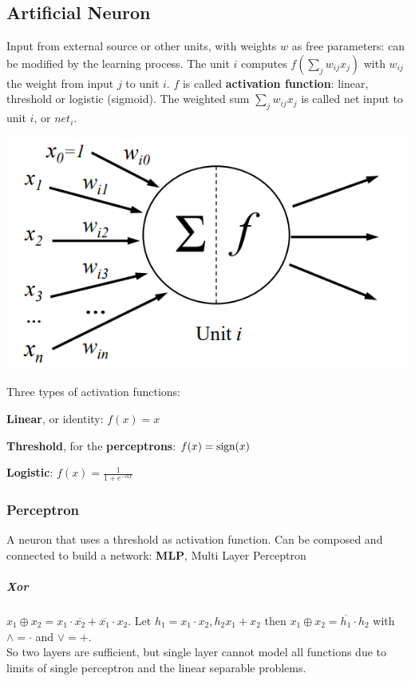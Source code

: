 \documentclass[10pt]{report}
\begin{document}
\subsection{Artificial Neuron} Input from external source or other units, with weights $w$ as free parameters: can be modified by the learning process. The unit $i$ computes $f(\sum_j w_{ij}x_j)$ with $w_{ij}$ the weight from input $j$ to unit $i$. $f$ is called \textbf{activation function}: linear, threshold or logistic (sigmoid). The weighted sum $\sum_j w_{ij}x_j$ is called net input to unit $i$, or $net_i$.
\begin{center}
	\includegraphics[scale=0.75]{6.png}
\end{center}
Three types of activation functions:
\begin{list}{}{}
	\item \textbf{Linear}, or identity: $f(x) = x$
	\item \textbf{Threshold}, for the \textbf{perceptrons}: $f(x) = \hbox{sign}(x)$
	\item \textbf{Logistic}: $f(x) = \frac{1}{1 + e^{-\alpha x}}$
\end{list}
\subsubsection{Perceptron} A neuron that uses a threshold as activation function. Can be composed and connected to build a network: \textbf{MLP}, Multi Layer Perceptron 
\subparagraph{Xor} $x_1 \oplus x_2 = x_1\cdot \overline{x_2} + \overline{x_1}\cdot x_2$. Let $h_1 = x_1\cdot x_2, h_2 x_1 + x_2$ then $x_1 \oplus x_2 = \overline{h_1} \cdot h_2$ with $\wedge = \cdot$ and $\vee = +$.\\
So two layers are sufficient, but single layer cannot model all functions due to limits of single perceptron and the linear separable problems.
\end{document}
